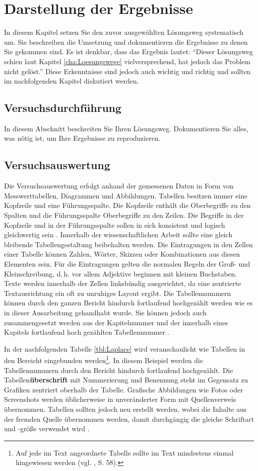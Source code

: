 \chapter{Darstellung der Ergebnisse}
In diesem Kapitel setzen Sie den zuvor ausgewählten Lösungsweg systematisch um. Sie beschreiben die Umsetzung und dokumentieren die Ergebnisse zu denen Sie gekommen sind. Es ist denkbar, dass das Ergebnis lautet: "`Dieser Lösungsweg schien laut Kapitel \ref{cha:Loesungswege} vielversprechend, hat jedoch das Problem nicht gelöst."' Diese Erkenntnisse sind jedoch auch wichtig und richtig und sollten im nachfolgenden Kapitel diskutiert werden.

\section{Versuchsdurchführung}
In diesem Abschnitt beschreiten Sie Ihren Lösungsweg. Dokumentieren Sie alles, was nötig ist, um Ihre Ergebnisse zu reproduzieren.

\section{Versuchsauswertung}
Die Versuchsauswertung erfolgt anhand der gemessenen Daten in Form von Messwerttabellen, Diagrammen und Abbildungen.
Tabellen besitzen immer eine Kopfzeile und eine Führungsspalte.
Die Kopfzeile enthält die Oberbegriffe zu den Spalten und die Führungsspalte Oberbegriffe zu den Zeilen.
Die Begriffe in der Kopfzeile und in der Führungsspalte sollen in sich konsistent und logisch gleichwertig sein \cite[S.~51]{Hering2009}.
Innerhalb der wissenschaftlichen Arbeit sollte eine gleich bleibende Tabellengestaltung beibehalten werden.
Die Eintragungen in den Zellen einer Tabelle können Zahlen, Wörter, Skizzen oder Kombinationen aus diesen Elementen sein.
Für die Eintragungen gelten die normalen Regeln der Groß- und Kleinschreibung, d.\,h. vor allem Adjektive beginnen mit kleinen Buchstaben.
Texte werden innerhalb der Zellen linksbündig ausgerichtet, da eine zentrierte Textausrichtung ein oft zu unruhiges Layout ergibt.
Die Tabellennummern können durch den ganzen Bericht hindurch fortlaufend hochgezählt werden wie es in dieser Ausarbeitung gehandhabt wurde.
Sie können jedoch auch zusammengesetzt werden aus der Kapitelnummer und der innerhalb eines Kapitels fortlaufend hoch gezählten Tabellennummer \cite[S.~54~ff.]{Hering2009}.

In der nachfolgenden Tabelle \ref{tbl:Laplace} wird veranschaulicht wie Tabellen in den Bereicht eingebunden werden\footnote{Auf jede im Text angeordnete Tabelle sollte im Text mindestens einmal hingewiesen werden (vgl. \cite{Hering2009}, S. 58).}.
In diesem Beispiel werden die Tabellennummern durch den Bericht hindurch fortlaufend hochgezählt.
Die Tabellen\textbf{überschrift} mit Nummerierung und Benennung steht im Gegensatz zu Grafiken zentriert oberhalb der Tabelle.
Grafische Abbildungen wie Fotos oder Screenshots werden üblicherweise in unveränderter Form mit Quellenverweis übernommen.
Tabellen sollten jedoch neu erstellt werden, wobei die Inhalte aus der fremden Quelle übernommen werden, damit durchgängig die gleiche Schriftart und -größe verwendet wird \cite[S.~113]{Balz2008}.

